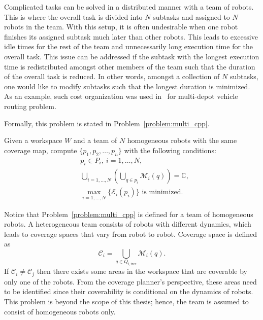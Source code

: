 \documentclass[../main.tex]{subfiles}
\begin{document}
Complicated tasks can be solved in a distributed manner with a team of robots. This is where the overall task is divided into $N$ subtasks and assigned to $N$ robots in the team. With this setup, it is often undesirable when one robot finishes its assigned subtask much later than other robots. This leads to excessive idle times for the rest of the team and unnecessarily long execution time for the overall task. This issue can be addressed if the subtask with the longest execution time is redistributed amongst other members of the team such that the duration of the overall task is reduced. In other words, amongst a collection of $N$ subtasks, one would like to modify subtasks such that the longest duration is minimized. As an example, such cost organization was used in~\cite{carlsson2009solving} for multi-depot vehicle routing problem.

Formally, this problem is stated in Problem~\ref{problem:multi_cpp}.
\begin{problem}
\label{problem:multi_cpp}
	Given a workspace $W$ and a team of $N$ homogeneous robots with the same coverage map, compute $\{p_1,p_2,\ldots,p_n\}$ with the following conditions:
	\begin{equation}
	\begin{aligned}
		& p_i\in P_{i},\ i=1,\dots,N,\\
		& \bigcup_{i=1,\dots,N}(\bigcup_{q\in p_i}\mathcal{M}_i(q))=\mathbb{C},\\
		& \max_{i=1,\ldots,N}\{\mathcal{E}_i(p_i)\}\text{ is minimized.}
	\end{aligned}
	\end{equation}
\end{problem}

\begin{remark}
	Notice that Problem~\ref{problem:multi_cpp} is defined for a team of homogeneous robots.
	A heterogeneous team consists of robots with different dynamics, which leads to coverage spaces that vary from robot to robot. Coverage space is defined as
	\begin{equation}
		\mathcal{C}_i=\bigcup_{q\in Q_{i,\text{free}}}\mathcal{M}_i(q).
	\end{equation}
	If $\mathcal{C}_i\neq\mathcal{C}_j$ then there exists some areas in the workspace that are coverable by only one of the robots. From the coverage planner's perspective, these areas need to be identified since their coverability is conditional on the dynamics of robots. This problem is beyond the scope of this thesis; hence, the team is assumed to consist of homogeneous robots only.

	\RE
\end{remark}
\end{document}

